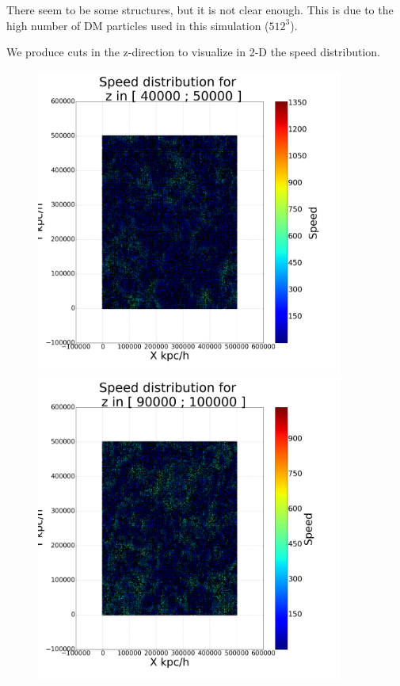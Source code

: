 \documentclass[12pt]{article}
\begin{document}
There seem to be some structures, but it is not clear enough. This is due to the high number of DM particles used in this simulation ($512^3$). 


We produce cuts in the z-direction to visualize in 2-D the speed distribution. \\


\begin{figure}[ht]
\centering
\begin{minipage}{.45\textwidth}
  \centering
  \includegraphics[width=0.9\textwidth]{graphs/scatter_magnitud_vel50000.png}
\end{minipage}%
\begin{minipage}{.45\textwidth}
  \centering
  \includegraphics[width=0.9\textwidth]{graphs/scatter_magnitud_vel100000.png}

\end{minipage}
\end{figure}
\end{document}
